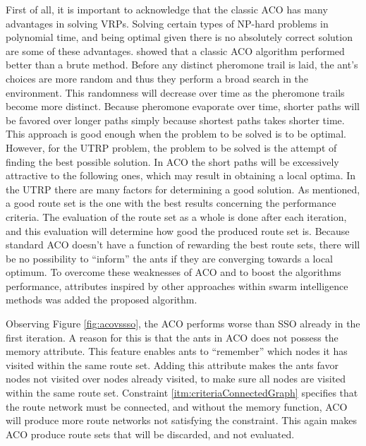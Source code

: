 First of all, it is important to acknowledge that the classic ACO has many advantages in solving VRPs. Solving certain types of NP-hard problems in polynomial time, and being optimal given there is no absolutely correct solution are some of these advantages. \citet{hsiao04} showed that a classic ACO algorithm performed better than a brute method. Before any distinct pheromone trail is laid, the ant's choices are more random and thus they perform a broad search in the environment. This randomness will decrease over time as the pheromone trails become more distinct. Because pheromone evaporate over time, shorter paths will be favored over longer paths simply because shortest paths takes shorter time. This approach is good enough when the problem to be solved is to be optimal. However, for the UTRP problem, the problem to be solved is the attempt of finding the best possible solution. In ACO the short paths will be excessively attractive to the following ones, which may result in obtaining a local optima. In the UTRP there are many factors for determining a good solution. As mentioned, a good route set is the one with the best results concerning the performance criteria. The evaluation of the route set as a whole is done after each iteration, and this evaluation will determine how good the produced route set is. Because standard ACO doesn't have a function of rewarding the best route sets, there will be no possibility to ``inform'' the ants if they are converging towards a local optimum. To overcome these weaknesses of ACO and to boost the algorithms performance, attributes inspired by other approaches within swarm intelligence methods was added the proposed algorithm. %

Observing Figure \ref{fig:acovssso}, the ACO performs worse than SSO already in the first iteration. A reason for this is that the ants in ACO does not possess the memory attribute. This feature enables ants to ``remember'' which nodes it has visited within the same route set. Adding this attribute makes the ants favor nodes not visited over nodes already visited, to make sure all nodes are visited within the same route set. Constraint \vref{itm:criteriaConnectedGraph} specifies that the route network must be connected, and without the memory function, ACO will produce more route networks not satisfying the constraint. This again makes ACO produce route sets that will be discarded, and not evaluated. %

